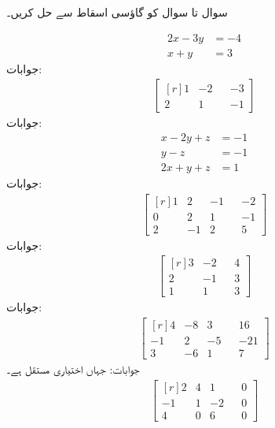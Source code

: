 سوال  تا سوال  کو گاؤسی اسقاط سے حل کریں۔

\begin{align*}
2x-3y&=-4\\
x+y&=3
\end{align*}
جوابات:
\begin{align*}
\begin{bmatrix*}[r] 1&-2&&-3\\2&1&&-1 \end{bmatrix*}
\end{align*}
جوابات:
\begin{align*}
x-2y+z&=-1\\
y-z&=-1\\
2x+y+z&=1
\end{align*}
جوابات:
\begin{align*}
\begin{bmatrix*}[r]
1&2&-1&&-2\\0&2&1&&-1\\2&-1&2&&5
\end{bmatrix*}
\end{align*}
جوابات:
\begin{align*}
\begin{bmatrix*}[r] 
3&-2&&4\\
2&-1&&3\\
1&1&&3
\end{bmatrix*}
\end{align*}
جوابات:
\begin{align*}
\begin{bmatrix*}[r]  
4&-8&3&&16\\
-1&2&-5&&-21\\
3&-6&1&&7
\end{bmatrix*}
\end{align*}
جوابات: جہاں  اختیاری مستقل ہے۔
\begin{align*}
\begin{bmatrix*}[r]
2&4&1&&0\\
-1&1&-2&&0\\
4&0&6&&0
\end{bmatrix*}
\end{align*}
